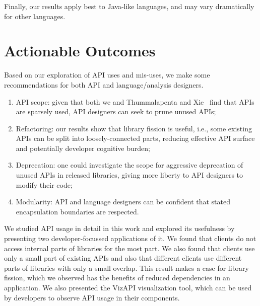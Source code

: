 Finally, our results apply best to Java-like languages, and
may vary dramatically for other languages.

\section{Actionable Outcomes}
Based on our exploration of API uses and mis-uses, we make some recommendations
for both API and language/analysis designers.

\begin{enumerate}
\item API scope: given that both we and Thummalapenta and Xie~\cite{thummalapenta08:_spotw} find
that APIs are sparsely used, API designers can seek to prune unused APIs;
\item Refactoring: our results show that library fission is useful, i.e., some existing APIs can be split into loosely-connected parts, reducing effective API surface and potentially developer cognitive burden;
\item Deprecation: one could investigate the scope for aggressive deprecation of unused APIs in released libraries, giving more liberty to API designers to modify their code;
\item Modularity: API and language designers can be confident that stated encapsulation boundaries are respected.
\end{enumerate}


We studied API usage in detail in this work and explored its usefulness by presenting two developer-focussed applications of it. We found that clients do not access internal parts of libraries for the most part. We also found that clients use only a small part of existing APIs and also that different clients use different parts of libraries with only a small overlap. This result makes a case for library fission, which we observed has the benefits of reduced dependencies in an application. We also presented the VizAPI visualization tool, which can be used by developers to observe API usage in their components.
